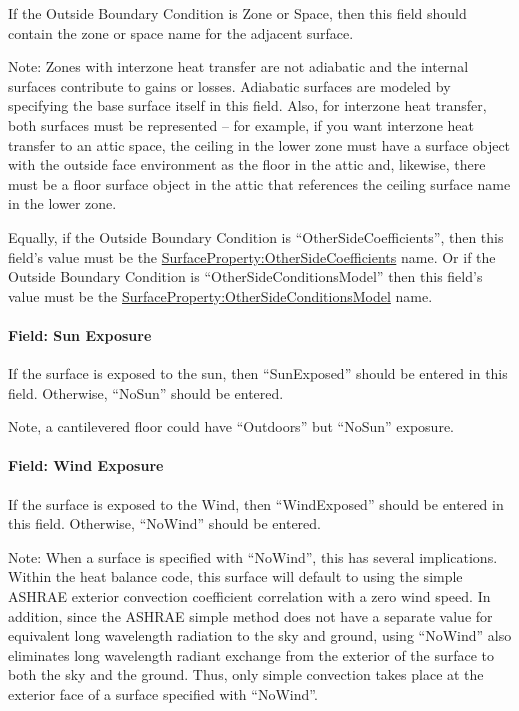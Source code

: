 If the Outside Boundary Condition is Zone or Space, then this field should contain the zone or space name for the adjacent surface.

\begin{callout}
Note: Zones with interzone heat transfer are not adiabatic and the internal surfaces contribute to gains or losses. Adiabatic surfaces are modeled by specifying the base surface itself in this field. Also, for interzone heat transfer, both surfaces must be represented -- for example, if you want interzone heat transfer to an attic space, the ceiling in the lower zone must have a surface object with the outside face environment as the floor in the attic and, likewise, there must be a floor surface object in the attic that references the ceiling surface name in the lower zone.
\end{callout}

Equally, if the Outside Boundary Condition is ``OtherSideCoefficients'', then this field's value must be the \hyperref[surfacepropertyothersidecoefficients]{SurfaceProperty:OtherSideCoefficients} name. Or if the Outside Boundary Condition is ``OtherSideConditionsModel'' then this field's value must be the \hyperref[surfacepropertyothersideconditionsmodel]{SurfaceProperty:OtherSideConditionsModel} name.

\paragraph{Field: Sun Exposure}\label{field-sun-exposure-1}

If the surface is exposed to the sun, then ``SunExposed'' should be entered in this field. Otherwise, ``NoSun'' should be entered.

Note, a cantilevered floor could have ``Outdoors'' but ``NoSun'' exposure.

\paragraph{Field: Wind Exposure}\label{field-wind-exposure-1}

If the surface is exposed to the Wind, then ``WindExposed'' should be entered in this field. Otherwise, ``NoWind'' should be entered.

\begin{callout}
Note: When a surface is specified with ``NoWind'', this has several implications. Within the heat balance code, this surface will default to using the simple ASHRAE exterior convection coefficient correlation with a zero wind speed. In addition, since the ASHRAE simple method does not have a separate value for equivalent long wavelength radiation to the sky and ground, using ``NoWind'' also eliminates long wavelength radiant exchange from the exterior of the surface to both the sky and the ground. Thus, only simple convection takes place at the exterior face of a surface specified with ``NoWind''.
\end{callout}


